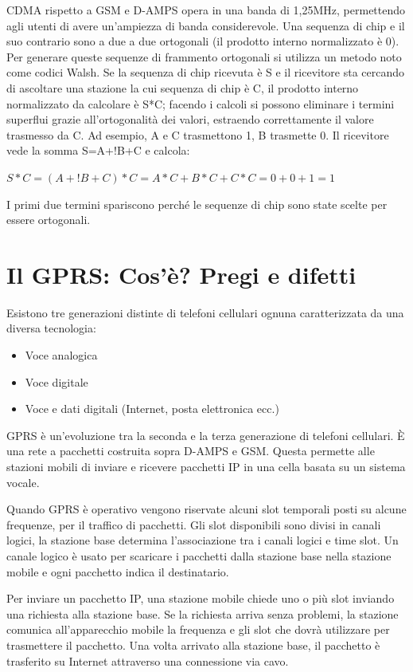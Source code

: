 CDMA rispetto a GSM e D-AMPS opera in una banda di 1,25MHz, permettendo agli utenti di avere un’ampiezza di banda considerevole.
Una sequenza di chip e il suo contrario sono a due a due ortogonali (il prodotto interno normalizzato è 0). Per generare queste sequenze di frammento ortogonali si utilizza un metodo noto come codici Walsh. 
Se la sequenza di chip ricevuta è S e il ricevitore sta cercando di ascoltare una stazione la cui sequenza di chip è C, il prodotto interno normalizzato da calcolare è S*C; facendo i calcoli si possono eliminare i termini superflui grazie all’ortogonalità dei valori, estraendo correttamente il valore trasmesso da C. 
Ad esempio, A e C trasmettono 1, B trasmette 0. Il ricevitore vede la somma S=A+!B+C e calcola:
\begin{center}
$S*C=(A+!B+C)*C=A*C+B*C+C*C=0+0+1=1$
\end{center}
I primi due termini spariscono perché le sequenze di chip sono state scelte per essere ortogonali.

\section{Il GPRS: Cos’è? Pregi e difetti}

Esistono tre generazioni distinte di telefoni cellulari ognuna caratterizzata da una diversa tecnologia:
\begin{itemize}
\item	Voce analogica
\item	Voce digitale
\item	Voce e dati digitali (Internet, posta elettronica ecc.)
\end{itemize}
GPRS è un’evoluzione tra la seconda e la terza generazione di telefoni cellulari. È una rete a pacchetti costruita sopra D-AMPS e GSM. Questa permette alle stazioni mobili di inviare e ricevere pacchetti IP in una cella basata su un sistema vocale.

Quando GPRS è operativo vengono riservate alcuni slot temporali posti su alcune frequenze, per il traffico di pacchetti.
Gli slot disponibili sono divisi in canali logici, la stazione base determina l’associazione tra i canali logici e time slot. Un canale logico è usato per scaricare i pacchetti dalla stazione base nella stazione mobile e ogni pacchetto indica il destinatario.

Per inviare un pacchetto IP, una stazione mobile chiede uno o più slot inviando una richiesta alla stazione base. Se la richiesta arriva senza problemi, la stazione comunica all’apparecchio mobile la frequenza e gli slot che dovrà utilizzare per trasmettere il pacchetto. Una volta arrivato alla stazione base, il pacchetto è trasferito su Internet attraverso una connessione via cavo.

